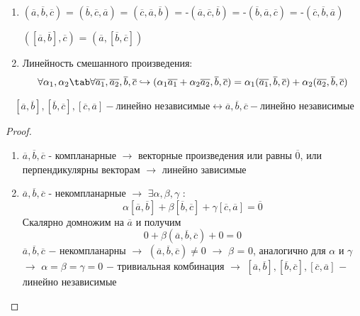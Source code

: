 \begin{enumerate}
    \item $(\overline{a}, \overline{b}, \overline{c})$ = $(\overline{b}, \overline{c}, \overline{a})$ = $(\overline{c}, \overline{a}, \overline{b})$ = -$(\overline{a}, \overline{c}, \overline{b})$ = -$(\overline{b}, \overline{a}, \overline{c})$ = -$(\overline{c}, \overline{b}, \overline{a})$
    \begin{corollary}
        $([\overline{a}, \overline{b}], \overline{c})$ = $(\overline{a}, [\overline{b}, \overline{c}])$
    \end{corollary}
    \item Линейность смешанного произведения:
    \[
    \forall\alpha_1, \alpha_2\tab\forall\overline{a_1}, \overline{a_2}, \overline{b}, \overline{c}\hookrightarrow (\alpha_1\overline{a_1} + \alpha_2\overline{a_2}, \overline{b}, \overline{c}) = \alpha_1(\overline{a_1}, \overline{b}, \overline{c}) + \alpha_2(\overline{a_2}, \overline{b}, \overline{c})
    \]
\end{enumerate}

\begin{theorem}
    \[
    [\overline{a}, \overline{b}], [\overline{b}, \overline{c}], [\overline{c}, \overline{a}] - \text{линейно независимые} \longleftrightarrow \overline{a}, \overline{b}, \overline{c} - \text{линейно независимые}
    \]
\end{theorem}
\begin{proof}
    \tab\\
    \begin{enumerate}
        \item $\overline{a}, \overline{b}, \overline{c}$ - компланарные $\longrightarrow$ векторные произведения или равны $\overline{0}$, или перпендикулярны векторам $\longrightarrow$ линейно зависимые
        \item $\overline{a}, \overline{b}, \overline{c}$ - некомпланарные $\longrightarrow$ $\exists \alpha,\beta,\gamma$ :
        \[
        \alpha[\overline{a}, \overline{b}] + \beta[\overline{b}, \overline{c}] + \gamma[\overline{c}, \overline{a}] = \overline{0}
        \]
        Скалярно домножим на $\overline{a}$ и получим
        \[
        0 + \beta(\overline{a}, \overline{b}, \overline{c}) + 0 = 0
        \]
        $\overline{a}, \overline{b}, \overline{c}$ $-$ некомпланарны $\longrightarrow$ $(\overline{a}, \overline{b}, \overline{c})\neq 0$ $\longrightarrow$ $\beta$ = 0, аналогично для $\alpha$ и $\gamma$ $\longrightarrow$ $\alpha=\beta=\gamma=0$ $-$ тривиальная комбинация $\longrightarrow$ $[\overline{a}, \overline{b}], [\overline{b}, \overline{c}], [\overline{c}, \overline{a}]$ $-$ линейно независимые
        
    \end{enumerate}
\end{proof}

